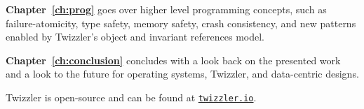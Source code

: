 \vspace{1.5em}

\noindent\textbf{Chapter~\ref{ch:prog}} goes over higher level programming concepts, such as failure-atomicity, type safety,
memory safety, crash consistency, and new patterns enabled by Twizzler's object and invariant references
model.

\vspace{1.5em}

\noindent\textbf{Chapter~\ref{ch:conclusion}} concludes with a look back on the presented work and a look to the future for
operating systems, Twizzler, and data-centric designs.


\chendsep

Twizzler is open-source and can be found at \href{https://twizzler.io}{\texttt{twizzler.io}}.
